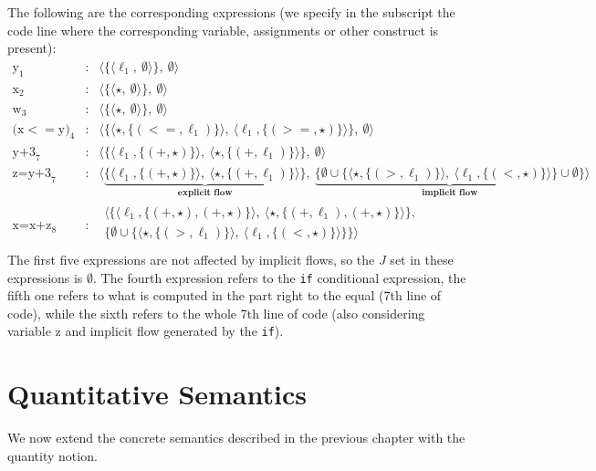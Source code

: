 \documentclass{llncs}
\newcommand{\blangle}{\big\langle}
\newcommand{\brangle}{\big\rangle}
\begin{document}
\noindent The following are the corresponding expressions (we specify in the subscript the code line where the corresponding variable, assignments or other construct is present):
{\footnotesize \[
\begin{array}{ccl}
\mbox{y}_{1} &:& \blangle\{\langle \ell_1,\ \emptyset\rangle\},\ \emptyset\brangle\\
\mbox{x}_{2} &:& \blangle\{\langle \star,\ \emptyset\rangle\},\ \emptyset\brangle\\
\mbox{w}_{3} &:& \blangle\{\langle \star,\ \emptyset\rangle\},\ \emptyset\brangle\\
\mbox{(x$<=$y)}_{4} &:& \blangle\{\langle\star,\{(<=,\ell_1)\}\rangle,\ \langle \ell_1, \{(>=,\star)\}\rangle\},\ \emptyset\brangle\\
\mbox{y+3}_{7} &:& \blangle\{\langle \ell_1,\{(+,\star)\}\rangle,\ \langle \star, \{(+,\ell_1)\}\rangle\},\ \emptyset\brangle\\
\mbox{z=y+3}_{7} &:& \blangle\underbrace{\{\langle \ell_1,\{(+,\star)\}\rangle,\ \langle \star, \{(+, \ell_1)\}\rangle\}}_\textbf{explicit flow},\ \underbrace{\{\emptyset\cup\{\langle\star,\{(>, \ell_1)\}\rangle,\ \langle \ell_1, \{(<,\star)\}\rangle\}\cup\emptyset\} }_\textbf{implicit flow}\brangle\\
\mbox{x=x+z}_{8} &:&
\begin{array}{l}
 \blangle\{\langle \ell_1,\{(+,\star),(+,\star)\}\rangle,\ \langle \star, \{(+,\ell_1),(+,\star)\}\rangle\},\\ \{\emptyset\cup\{\langle\star,\{(>,\ell_1)\}\rangle,\ \langle \ell_1, \{(<,\star)\}\rangle\}\} \brangle\\
\end{array}
\end{array}
\]}
The first five expressions are not affected by implicit flows, so the $J$ set in these expressions is $\emptyset$. The fourth expression refers to the \texttt{if} conditional expression, the fifth one refers to what is computed in the part right to the equal (7th line of code), while the sixth refers to the whole 7th line of code (also considering variable z and implicit flow generated by the \texttt{if}).\\

\section{Quantitative Semantics}

We now extend the concrete semantics described in the previous chapter with the quantity notion. 
\end{document}
